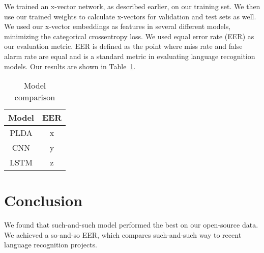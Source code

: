 \documentclass{llncs}
\begin{document}
We trained an x-vector network, as described earlier, on our training set. We then use our trained weights to calculate x-vectors for validation and test sets as well. We used our x-vector embeddings as features in several different models, minimizing the categorical crossentropy loss. We used equal error rate (EER) as our evaluation metric. EER is defined as the point where miss rate and false alarm rate are equal and is a standard metric in evaluating language recognition models. Our results are shown in Table~\ref{table3}.

\begin{table}
\caption{Model comparison}\label{table3}
\begin{center}
\begin{tabular}{ c c }
\toprule
Model & EER \\
\midrule
PLDA & x \\
CNN & y \\
LSTM & z \\
\bottomrule
\end{tabular}
\end{center}
\end{table}

\section{Conclusion}

We found that such-and-such model performed the best on our open-source data. We achieved a so-and-so EER, which compares such-and-such way to recent language recognition projects.
\end{document}
